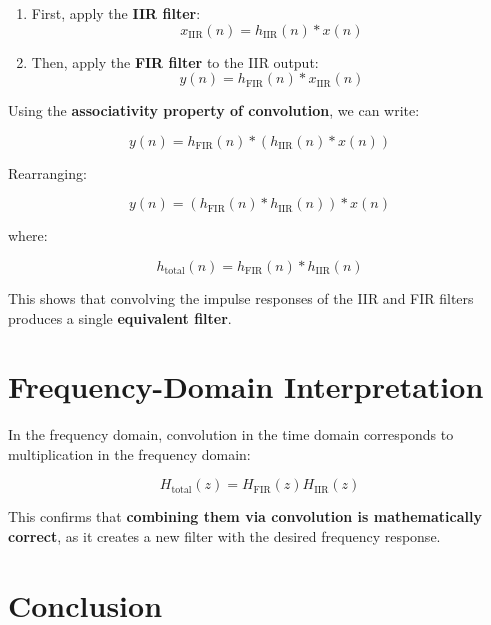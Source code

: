 \begin{enumerate}
    \item First, apply the \textbf{IIR filter}:
    \begin{equation}
        x_{\text{IIR}}(n) = h_{\text{IIR}}(n) * x(n)
    \end{equation}

    \item Then, apply the \textbf{FIR filter} to the IIR output:
    \begin{equation}
        y(n) = h_{\text{FIR}}(n) * x_{\text{IIR}}(n)
    \end{equation}
\end{enumerate}

Using the \textbf{associativity property of convolution}, we can write:

\begin{equation}
    y(n) = h_{\text{FIR}}(n) * (h_{\text{IIR}}(n) * x(n))
\end{equation}

Rearranging:

\begin{equation}
    y(n) = (h_{\text{FIR}}(n) * h_{\text{IIR}}(n)) * x(n)
\end{equation}

where:

\begin{equation}
    h_{\text{total}}(n) = h_{\text{FIR}}(n) * h_{\text{IIR}}(n)
\end{equation}

This shows that convolving the impulse responses of the IIR and FIR filters produces a single \textbf{equivalent filter}.

\section{Frequency-Domain Interpretation}

In the frequency domain, convolution in the time domain corresponds to multiplication in the frequency domain:

\begin{equation}
    H_{\text{total}}(z) = H_{\text{FIR}}(z) H_{\text{IIR}}(z)
\end{equation}

This confirms that \textbf{combining them via convolution is mathematically correct}, as it creates a new filter with the desired frequency response.

\section{Conclusion}

